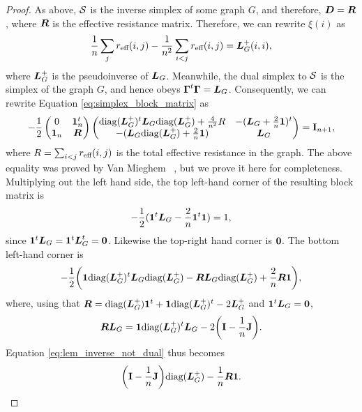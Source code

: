 \begin{proof}
As above, $\mathcal{S}$ is the inverse simplex of some graph $G$, and therefore, $\vb*{D}=\vb*{R}$, where $\vb*{R}$ is the effective resistance matrix. Therefore, we can rewrite $\xi(i)$ as 
\begin{align*}
\frac{1}{n}\sum_j r_{\text{eff}}(i,j) - \frac{1}{n^2}\sum_{i<j}r_{\text{eff}}(i,j)=\vb*{L}_G^+(i,i),
\end{align*}
where $\vb*{L}_G^+$ is the pseudoinverse of $\vb*{L}_G$. Meanwhile, the dual simplex to $\mathcal{S}$ is the simplex of the graph $G$, and hence obeys $\vb*{\Gamma}^t\vb*{\Gamma}=\vb*{L}_G$. Consequently, we can rewrite Equation \ref{eq:simplex_block_matrix} as 
\begin{equation*}
	-\frac{1}{2} \begin{pmatrix}
0 & \vb{1}_n^t \\ 
\vb{1}_n &  \vb*{R}
\end{pmatrix}
\begin{pmatrix}
\text{diag}(\vb*{L}_G^+)^t \vb*{L}_G\text{diag}(\vb*{L}_G^+) + \frac{4}{n^2}R & -(\vb*{L}_G + \frac{2}{n}\vb{1})^t \\
-(\vb*{L}_G\text{diag}(\vb*{L}_G^+) + \frac{2}{n}\vb{1}) & \vb*{L}_G
\end{pmatrix} = \vb{I}_{n+1},
\end{equation*}
where $R=\sum_{i<j}r_{\text{eff}}(i,j)$ is the total effective resistance in the graph. The above equality was proved by Van Mieghem \etal~\cite{van2017pseudoinverse}, but we prove it here for completeness. Multiplying out the left hand side, the top left-hand corner of the resulting block matrix is
\[-\frac{1}{2}(\vb{1}^t\vb*{L}_G - \frac{2}{n}\vb{1}^t \vb{1}) = 1,\]
since $\vb{1}^t \vb*{L}_G=\vb{1}^t\vb*{L}_G^t =\vb{0}$. Likewise the top-right hand corner is $\vb{0}$. The bottom left-hand corner is 
\begin{equation}
\label{eq:lem_block_matrix}
-\frac{1}{2}\bigg(\vb{1}\text{diag}(\vb*{L}_G^+)^t \vb*{L}_G\text{diag}(\vb*{L}_G^+) - \vb*{R}\vb*{L}_G\text{diag}(\vb*{L}_G^+) + \frac{2}{n}\vb*{R}\vb{1}\bigg),
\end{equation}
where, using that $\vb*{R}=\text{diag}(\vb*{L}_G^+) \vb{1}^t + \vb{1} \text{diag}(\vb*{L}_G^+)^t -2\vb*{L}_G^+$ and $\vb{1}^t\vb*{L}_G=\vb{0}$, 
\begin{align*}
\vb*{R}\vb*{L}_G = \vb{1}\text{diag}(\vb*{L}_G^+)^t \vb*{L}_G - 2\bigg(\vb{I}-\frac{1}{n}\vb{J}\bigg).
\end{align*}
Equation \eqref{eq:lem_inverse_not_dual} thus becomes 
\begin{align*}
\bigg(\vb{I}-\frac{1}{n}\vb{J}\bigg)\text{diag}(\vb*{L}_G^+) - \frac{1}{n}\vb*{R}\vb{1}.
\end{align*}
\end{proof}





